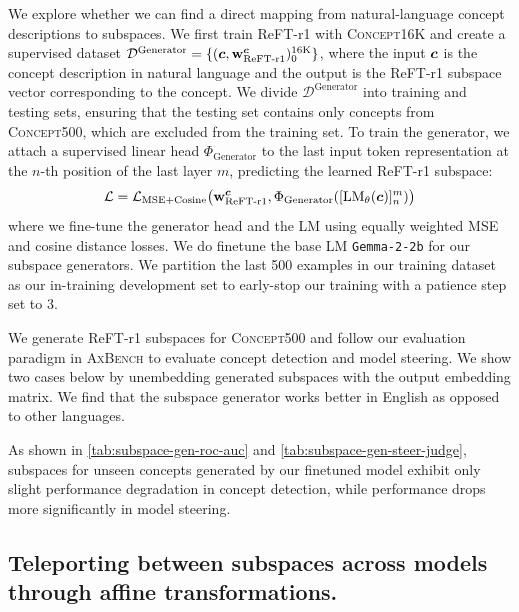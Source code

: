 \documentclass{article}
\theoremstyle{plain}
\theoremstyle{definition}
\theoremstyle{remark}
\newcommand{\shortbenchmark}{\textsc{AxBench}}
\begin{document}
We explore whether we can find a direct mapping from natural-language concept descriptions to subspaces. We first train ReFT-r1 with \textsc{Concept16K} and create a supervised dataset $\mathcal{D}^{\text{Generator}} = \{({\bm{c}}, \mathbf{w}_{\text{ReFT-r1}}^{{\bm{c}}})_{0}^{\text{16K}}\}$, where the input ${\bm{c}}$ is the concept description in natural language and the output is the ReFT-r1 subspace vector corresponding to the concept. We divide $\mathcal{D}^{\text{Generator}}$ into training and testing sets, ensuring that the testing set contains only concepts from \textsc{Concept500}, which are excluded from the training set. To train the generator, we attach a supervised linear head $\Phi_{\text{Generator}}$ to the last input token representation at the $n$-th position of the last layer $m$, predicting the learned ReFT-r1 subspace:  
\begin{equation}
{\mathcal{L}} = {\mathcal{L}}_{\text{MSE+Cosine}}\bigl(\mathbf{w}_{\text{ReFT-r1}}^{{\bm{c}}}, \Phi_{\text{Generator}}([\mathrm{LM}_{\theta}({\bm{c}})]_{n}^{m})\bigr)
\end{equation}
where we fine-tune the generator head and the LM using equally weighted MSE and cosine distance losses. We do finetune the base LM \texttt{Gemma-2-2b} for our subspace generators. 
We partition the last 500 examples in our training dataset as our in-training development set to early-stop our training with a patience step set to 3.

We generate ReFT-r1 subspaces for \textsc{Concept500} and follow our evaluation paradigm in \shortbenchmark{} to evaluate concept detection and model steering. We show two cases below by unembedding generated subspaces with the output embedding matrix. We find that the subspace generator works better in English as opposed to other languages. 

As shown in \cref{tab:subspace-gen-roc-auc} and \cref{tab:subspace-gen-steer-judge}, subspaces for unseen concepts generated by our finetuned model exhibit only slight performance degradation in concept detection, while performance drops more significantly in model steering.





\clearpage

\subsection{Teleporting between subspaces across models through affine transformations.}\label{sec:subspace-transform} 
\end{document}

